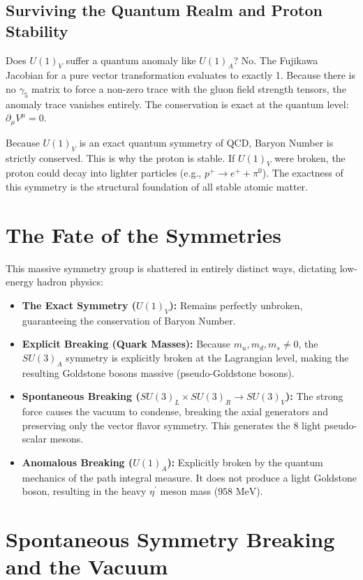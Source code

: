 \documentclass[12pt, a4paper]{article}
\begin{document}
\subsection{Surviving the Quantum Realm and Proton Stability}
Does $U(1)_V$ suffer a quantum anomaly like $U(1)_A$? No. The Fujikawa Jacobian for a pure vector transformation evaluates to exactly 1. Because there is no $\gamma_5$ matrix to force a non-zero trace with the gluon field strength tensors, the anomaly trace vanishes entirely. The conservation is exact at the quantum level: $\partial_\mu V^\mu = 0$.

Because $U(1)_V$ is an exact quantum symmetry of QCD, Baryon Number is strictly conserved. This is why the proton is stable. If $U(1)_V$ were broken, the proton could decay into lighter particles (e.g., $p^+ \rightarrow e^+ + \pi^0$). The exactness of this symmetry is the structural foundation of all stable atomic matter.

\section{The Fate of the Symmetries}

This massive symmetry group is shattered in entirely distinct ways, dictating low-energy hadron physics:

\begin{itemize}
    \item \textbf{The Exact Symmetry ($U(1)_V$):} Remains perfectly unbroken, guaranteeing the conservation of Baryon Number.
    \item \textbf{Explicit Breaking (Quark Masses):} Because $m_u, m_d, m_s \neq 0$, the $SU(3)_A$ symmetry is explicitly broken at the Lagrangian level, making the resulting Goldstone bosons massive (pseudo-Goldstone bosons).
    \item \textbf{Spontaneous Breaking ($SU(3)_L \times SU(3)_R \to SU(3)_V$):} The strong force causes the vacuum to condense, breaking the axial generators and preserving only the vector flavor symmetry. This generates the 8 light pseudo-scalar mesons.
    \item \textbf{Anomalous Breaking ($U(1)_A$):} Explicitly broken by the quantum mechanics of the path integral measure. It does not produce a light Goldstone boson, resulting in the heavy $\eta^\prime$ meson mass ($958 \text{ MeV}$).
\end{itemize}

\section{Spontaneous Symmetry Breaking and the Vacuum}
\end{document}
